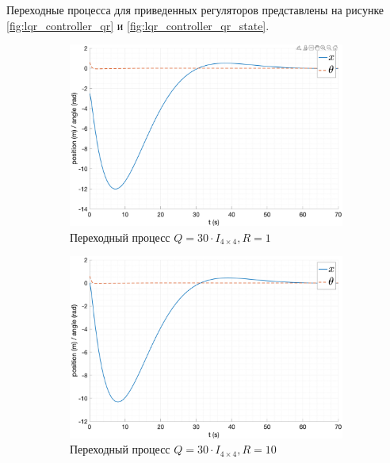 Переходные процесса для приведенных регуляторов представлены на рисунке \ref{fig:lqr_controller_qr} и \ref{fig:lqr_controller_qr_state}.
\begin{figure}[ht!]
    \centering
    \begin{subfigure}[b]{0.45\textwidth}
        \centering
        \includegraphics[width=\textwidth]{media/plots/LQR/out_6.png}
        \caption{Переходный процесс $Q = 30 \cdot I_{4\times 4}, R = 1$}
    \end{subfigure}
    \begin{subfigure}[b]{0.45\textwidth}
        \centering
        \includegraphics[width=\textwidth]{media/plots/LQR/out_7.png}
        \caption{Переходный процесс $Q = 30 \cdot I_{4\times 4}, R = 10$}
    \end{subfigure}
    \begin{subfigure}[b]{0.45\textwidth}
        \centering

\end{subfigure}
\end{figure}
